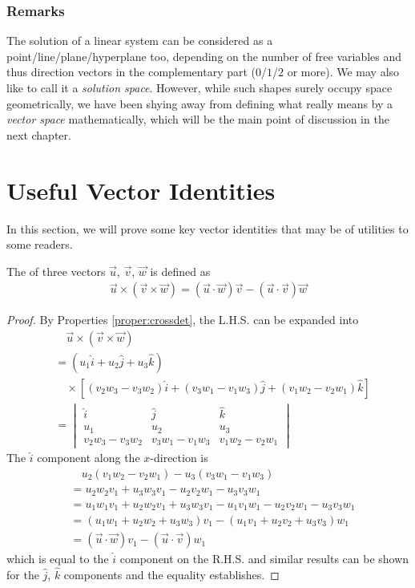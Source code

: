 \subsubsection{Remarks}
The solution of a linear system can be considered as a point/line/plane/hyperplane too, depending on the number of free variables and thus direction vectors in the complementary part ($0$/$1$/$2$ or more). We may also like to call it a \textit{solution space}. However, while such shapes surely occupy space geometrically, we have been shying away from defining what really means by a \textit{vector space} mathematically, which will be the main point of discussion in the next chapter.

\section{Useful Vector Identities}
In this section, we will prove some key vector identities that may be of utilities to some readers.
\begin{proper}
\label{proper:triplecross}
The  of three vectors $\vec{u}$, $\vec{v}$, $\vec{w}$ is defined as
\begin{align}
\vec{u} \times (\vec{v} \times \vec{w}) = (\vec{u} \cdot \vec{w})\vec{v} - (\vec{u} \cdot \vec{v})\vec{w}
\label{eqn:triplecross}
\end{align}
\end{proper}
\begin{proof}
By Properties \ref{proper:crossdet}, the L.H.S. can be expanded into
\begin{align*}
&\quad\vec{u} \times (\vec{v} \times \vec{w}) \\
&= (u_1\hat{i} + u_2\hat{j} + u_3\hat{k}) \\
&\quad \times [(v_2w_3 - v_3w_2)\hat{i} + (v_3w_1 - v_1w_3)\hat{j} + (v_1w_2 - v_2w_1)\hat{k}] \\
&= 
\begin{vmatrix}
\hat{i} & \hat{j} & \hat{k} \\
u_1 & u_2 & u_3 \\
v_2w_3 - v_3w_2 & v_3w_1 - v_1w_3 & v_1w_2 - v_2w_1 
\end{vmatrix}
\end{align*}
The $\hat{i}$ component along the $x$-direction is
\begin{align*}
&\quad u_2(v_1w_2 - v_2w_1) - u_3(v_3w_1 - v_1w_3) \\
&= u_2w_2v_1 + u_3w_3v_1 - u_2v_2w_1 - u_3v_3w_1 \\
&= u_1w_1v_1 + u_2w_2v_1 + u_3w_3v_1 - u_1v_1w_1 - u_2v_2w_1 - u_3v_3w_1 \\
&= (u_1w_1 + u_2w_2 + u_3w_3)v_1 - (u_1v_1 + u_2v_2 + u_3v_3)w_1 \\
&= (\vec{u} \cdot \vec{w})v_1 - (\vec{u} \cdot \vec{v})w_1
\end{align*}
which is equal to the $\hat{i}$ component on the R.H.S. and similar results can be shown for the $\hat{j}$, $\hat{k}$ components and the equality establishes.
\end{proof}


